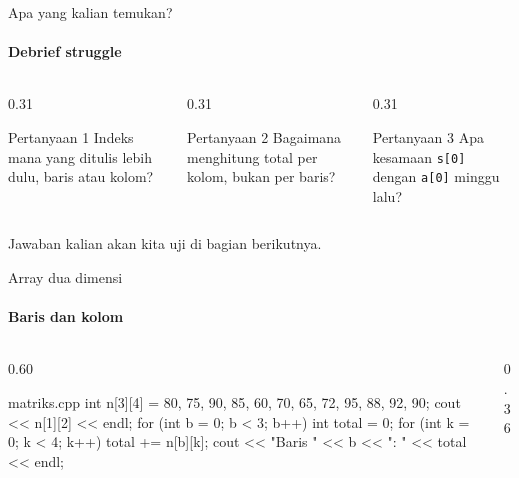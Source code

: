 \documentclass[t]{beamer}
\begin{document}
\begin{frame}{Apa yang kalian temukan?}
\framesubtitle{Debrief struggle}
\begin{columns}[T]
\begin{column}{0.31\textwidth}
\begin{BlokGelap}{Pertanyaan 1}
Indeks mana yang ditulis lebih dulu, baris atau kolom?
\end{BlokGelap}
\end{column}
\begin{column}{0.31\textwidth}
\begin{BlokGelap}{Pertanyaan 2}
Bagaimana menghitung total per kolom, bukan per baris?
\end{BlokGelap}
\end{column}
\begin{column}{0.31\textwidth}
\begin{BlokGelap}{Pertanyaan 3}
Apa kesamaan \texttt{s[0]} dengan \texttt{a[0]} minggu lalu?
\end{BlokGelap}
\end{column}
\end{columns}
\vspace{10pt}
Jawaban kalian akan kita uji di bagian berikutnya.
\end{frame}


\begin{frame}[fragile]{Array dua dimensi}
\framesubtitle{Baris dan kolom}
\begin{columns}[T]
\begin{column}{0.60\textwidth}
\begin{Kode}[listing options={style=ITERACodeKecil}]{matriks.cpp}
int n[3][4] = {{80, 75, 90, 85},
               {60, 70, 65, 72},
               {95, 88, 92, 90}};
cout << n[1][2] << endl;
for (int b = 0; b < 3; b++) {
    int total = 0;
    for (int k = 0; k < 4; k++) total += n[b][k];
    cout << "Baris " << b << ": " << total << endl;
}
\end{Kode}
\end{column}
\begin{column}{0.36\textwidth}
\end{column}
\end{columns}
\end{frame}
\end{document}
